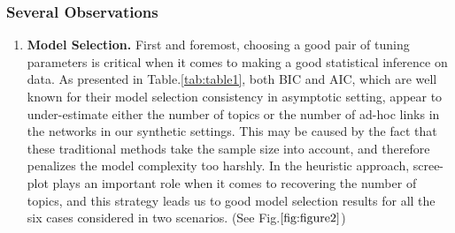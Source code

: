 \documentclass[AMS,STIX1COL]{WileyNJD-v2}
\begin{document}
{\subsubsection{Several Observations} \label{sec:obs}
\begin{enumerate}
    \item \textbf{Model Selection.}
    First and foremost, choosing a good pair of tuning parameters is critical when it comes to making a good statistical inference on data.
    As presented in Table.\ref{tab:table1}, both BIC and AIC, which are well known for their model selection consistency in asymptotic setting, appear to under-estimate either the number of topics or the number of ad-hoc links in the networks in our synthetic settings. This may be caused by the fact that these traditional methods take the sample size into account, and therefore penalizes the model complexity too harshly.
    In the heuristic approach, scree-plot plays an important role when it comes to recovering the number of topics, and this strategy leads us to good model selection results for all the six cases considered in two scenarios. (See Fig.$\ref{fig:figure2}$)


\end{enumerate}}
\end{document}
